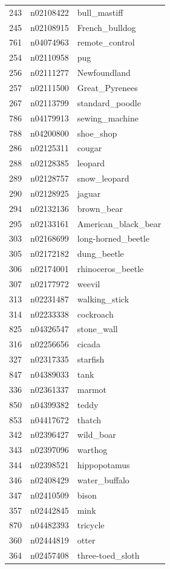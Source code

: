 \begin{table}
\begin{tabular}{cll}
243 & n02108422 & bull_mastiff \\
245 & n02108915 & French_bulldog \\
761 & n04074963 & remote_control \\
254 & n02110958 & pug \\
256 & n02111277 & Newfoundland \\
257 & n02111500 & Great_Pyrenees \\
267 & n02113799 & standard_poodle \\
786 & n04179913 & sewing_machine \\
788 & n04200800 & shoe_shop \\
286 & n02125311 & cougar \\
288 & n02128385 & leopard \\
289 & n02128757 & snow_leopard \\
290 & n02128925 & jaguar \\
294 & n02132136 & brown_bear \\
295 & n02133161 & American_black_bear \\
303 & n02168699 & long-horned_beetle \\
305 & n02172182 & dung_beetle \\
306 & n02174001 & rhinoceros_beetle \\
307 & n02177972 & weevil \\
313 & n02231487 & walking_stick \\
314 & n02233338 & cockroach \\
825 & n04326547 & stone_wall \\
316 & n02256656 & cicada \\
327 & n02317335 & starfish \\
847 & n04389033 & tank \\
336 & n02361337 & marmot \\
850 & n04399382 & teddy \\
853 & n04417672 & thatch \\
342 & n02396427 & wild_boar \\
343 & n02397096 & warthog \\
344 & n02398521 & hippopotamus \\
346 & n02408429 & water_buffalo \\
347 & n02410509 & bison \\
357 & n02442845 & mink \\
870 & n04482393 & tricycle \\
360 & n02444819 & otter \\
364 & n02457408 & three-toed_sloth \\

\end{tabular}
\end{table}
